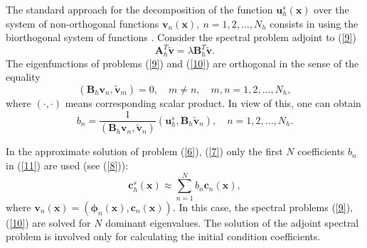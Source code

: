 \documentclass[a4paper]{jpconf}
\begin{document}
The standard approach for the decomposition of the function  $\bm u_h^s (\bm x) $ 
over the system of non-orthogonal functions $\bm v_n(\bm x), \ n = 1,2, ..., N_h$ 
consists in using the biorthogonal system of functions 
\cite{brezinski1991biorthogonality}.
Consider the spectral problem adjoint to (\ref{9})  
\begin{equation}\label{10}
 \bm A_h^T \widetilde{\bm v}  = \lambda  \bm B_h^T \widetilde{\bm v} .
\end{equation} 
The eigenfunctions of problems  (\ref{9}) and (\ref{10}) are orthogonal \cite{Laub2005,Ortega1987}  in the sense of the equality
\[
  (\bm B_h \bm v_n, \widetilde{\bm v}_m)= 0, 
  \quad m \neq n,
  \quad m, n = 1,2, ..., N_h , 
\] 
where $(\cdot, \cdot)$ means corresponding scalar product. 
In view of this, one can obtain
\begin{equation}\label{11}
 b_n = \frac{1}{(\bm B_h \bm v_n, \widetilde{\bm v}_n)} (\bm u_h^s, \bm B_h \widetilde{\bm v}_n),
 \quad n = 1,2, ..., N_h .  
\end{equation} 

In the approximate solution of problem   (\ref{6}), (\ref{7}) only the first $N$ coefficients  $b_n$ in (\ref{11}) are used (see (\ref{8})):
\begin{equation}\label{12}
 \bm c_h^s (\bm x) \approx  \sum_{n=1}^{N} b_n \bm c_n(\bm x) ,
\end{equation} 
where $\bm v_n (\bm x) = (\bm \phi_n (\bm x), \bm c_n (\bm x))$.
In this case, the spectral problems  (\ref{9}), (\ref{10}) are solved for $N$ dominant 
eigenvalues.
The solution of the adjoint spectral problem is involved only for calculating the initial condition coefficients. 
\end{document}
